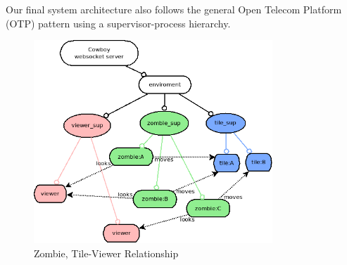Our final system architecture also follows the general Open Telecom Platform (OTP) pattern using a supervisor-process hierarchy.
\begin{figure}[h]
  \centering
  \includegraphics[width=0.8\textwidth]{img/system.png}
\caption{Zombie, Tile-Viewer Relationship}
    \label{fig:Zombie, Tile-Viewer Relationship}
\end{figure}

\clearpage
\endinput
